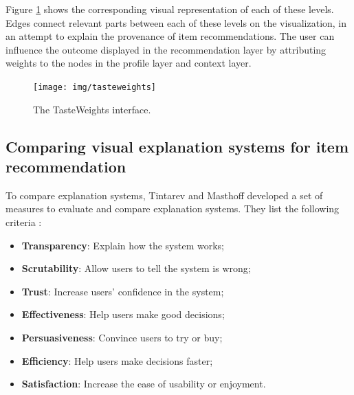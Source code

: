 Figure \ref{figure:tasteweights} shows the corresponding visual representation of each of these levels. Edges connect relevant parts between each of these levels on the visualization, in an attempt to explain the provenance of item recommendations. The user can influence the outcome displayed in the recommendation layer by attributing weights to the nodes in the profile layer and context layer\cite{bostandjiev:2012}.

\begin{figure}%
	\begin{center}
		\texttt{[image: img/tasteweights]}%
	\end{center}
	\caption{The TasteWeights interface.}%
	\label{figure:tasteweights}%
\end{figure}








\subsection{Comparing visual explanation systems for item recommendation}


To compare explanation systems, Tintarev and Masthoff developed a set of measures to evaluate and compare explanation systems. They list the following criteria \cite{tintarev:2007:SER:1547550.1547664}:

\begin{itemize}
	\item \textbf{Transparency}: Explain how the system works;
	\item \textbf{Scrutability}: Allow users to tell the system is wrong;
	\item \textbf{Trust}: Increase users' confidence in the system;
	\item \textbf{Effectiveness}: Help users make good decisions;
	\item \textbf{Persuasiveness}: Convince users to try or buy;
	\item \textbf{Efficiency}: Help users make decisions faster;
	\item \textbf{Satisfaction}: Increase the ease of usability or enjoyment.
\end{itemize}

